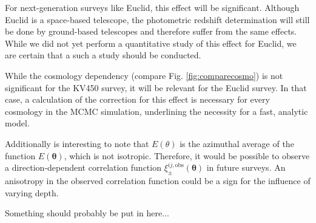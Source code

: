 \documentclass[referee]{aa} %
\renewcommand{\[}{\begin{equation}}
\renewcommand{\]}{\end{equation}}
\renewcommand{\rm}{\mathrm}
\def\b#1{\bm{#1}}
\begin{document}
For next-generation surveys like Euclid, this effect will be significant. Although Euclid is a space-based telescope, the photometric redshift determination will still be done by ground-based telescopes and therefore suffer from the same effects. While we did not yet perform a quantitative study of this effect for Euclid, we are certain that a such a study should be conducted.

While the cosmology dependency (compare Fig. \ref{fig:comparecosmo}) is not significant for the KV450 survey, it will be relevant for the Euclid survey. In that case, a calculation of the correction for this effect is necessary for every cosmology in the MCMC simulation, underlining the necessity for a fast, analytic model.

Additionally is interesting to note that $E(\theta)$ is the azimuthal average of the function $E(\b\theta)$, which is not isotropic. Therefore, it would be possible to observe a direction-dependent correlation function $\xi_\pm^{ij,\rm{obs}}(\b\theta)$ in future surveys. An anisotropy in the observed correlation function could be a sign for the influence of varying depth.



\begin{acknowledgements}
Something should probably be put in here...
\end{acknowledgements}
\end{document}
